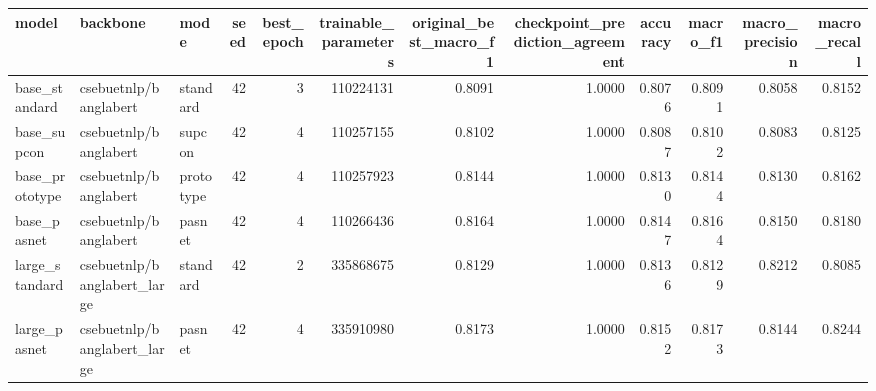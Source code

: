 \begin{tabular}{lllrrrrrrrrr}
\toprule
model & backbone & mode & seed & best\_epoch & trainable\_parameters & original\_best\_macro\_f1 & checkpoint\_prediction\_agreement & accuracy & macro\_f1 & macro\_precision & macro\_recall \\
\midrule
base\_standard & csebuetnlp/banglabert & standard & 42 & 3 & 110224131 & 0.8091 & 1.0000 & 0.8076 & 0.8091 & 0.8058 & 0.8152 \\
base\_supcon & csebuetnlp/banglabert & supcon & 42 & 4 & 110257155 & 0.8102 & 1.0000 & 0.8087 & 0.8102 & 0.8083 & 0.8125 \\
base\_prototype & csebuetnlp/banglabert & prototype & 42 & 4 & 110257923 & 0.8144 & 1.0000 & 0.8130 & 0.8144 & 0.8130 & 0.8162 \\
base\_pasnet & csebuetnlp/banglabert & pasnet & 42 & 4 & 110266436 & 0.8164 & 1.0000 & 0.8147 & 0.8164 & 0.8150 & 0.8180 \\
large\_standard & csebuetnlp/banglabert\_large & standard & 42 & 2 & 335868675 & 0.8129 & 1.0000 & 0.8136 & 0.8129 & 0.8212 & 0.8085 \\
large\_pasnet & csebuetnlp/banglabert\_large & pasnet & 42 & 4 & 335910980 & 0.8173 & 1.0000 & 0.8152 & 0.8173 & 0.8144 & 0.8244 \\
\bottomrule
\end{tabular}
